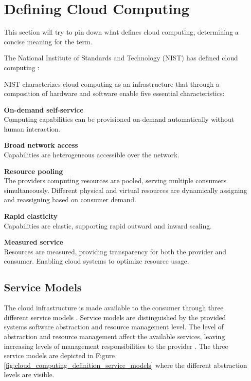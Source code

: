 \section{Defining Cloud Computing}
This section will try to pin down what defines cloud computing, determining a concise meaning for the term.

The National Institute of Standards and Technology (NIST) has defined cloud computing \cite{mell2011nist}:


NIST characterizes cloud computing as an infrastructure that through a composition of hardware and software enable five essential characteristics:

\textbf{On-demand self-service}\\
Computing capabilities can be provisioned on-demand automatically without human interaction.

\textbf{Broad network access}\\
Capabilities are heterogeneous accessible over the network.

\textbf{Resource pooling}\\
The providers computing resources are pooled, serving multiple consumers simultaneously. Different physical and virtual resources are dynamically assigning and reassigning based on consumer demand.

\textbf{Rapid elasticity}\\
Capabilities are elastic, supporting rapid outward and inward scaling. 

\textbf{Measured service}\\
Resources are measured, providing transparency for both the provider and consumer. Enabling cloud systems to optimize resource usage.

\subsection{Service Models}
The cloud infrastructure is made available to the consumer through three different service models \cite{mell2011nist}. Service models are distinguished by the provided systems software abstraction and resource management level. The level of abstraction and resource management affect the available services, leaving increasing levels of management responsibilities to the provider \cite[p. 52]{armbrust2010view}.
The three service models are depicted in Figure \ref{fig:cloud_computing_definition_service_models} where the different abstraction levels are visible.

